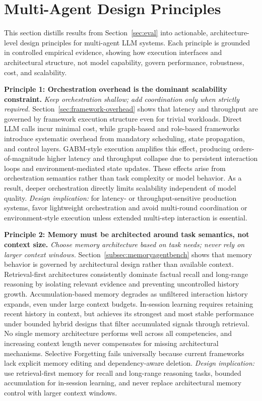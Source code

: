\section{Multi-Agent Design Principles}
\label{sec:design_principles}

This section distills results from Section~\ref{sec:eval} into actionable, architecture-level design principles for multi-agent LLM systems. Each principle is grounded in controlled empirical evidence, showing how execution interfaces and architectural structure, not model capability, govern performance, robustness, cost, and scalability.


\smallskip
\noindent\textbf{Principle 1: Orchestration overhead is the dominant scalability constraint.}
\emph{Keep orchestration shallow; add coordination only when strictly required.} Section~\ref{sec:framework-overhead} shows that latency and throughput are governed by framework execution structure even for trivial workloads. Direct LLM calls incur minimal cost, while graph-based and role-based frameworks introduce systematic overhead from mandatory scheduling, state propagation, and control layers. GABM-style execution amplifies this effect, producing orders-of-magnitude higher latency and throughput collapse due to persistent interaction loops and environment-mediated state updates. These effects arise from orchestration semantics rather than task complexity or model behavior. As a result, deeper orchestration directly limits scalability independent of model quality.
\emph{Design implication:} for latency- or throughput-sensitive production systems, favor lightweight orchestration and avoid multi-round coordination or environment-style execution unless extended multi-step interaction is essential.

\smallskip
\noindent\textbf{Principle 2: Memory must be architected around task semantics, not context size.}
\emph{Choose memory architecture based on task needs; never rely on larger context windows.}
Section~\ref{subsec:memoryagentbench} shows that memory behavior is governed by architectural design rather than available context. Retrieval-first architectures consistently dominate factual recall and long-range reasoning by isolating relevant evidence and preventing uncontrolled history growth. Accumulation-based memory degrades as unfiltered interaction history expands, even under large context budgets. In-session learning requires retaining recent history in context, but achieves its strongest and most stable performance under bounded hybrid designs that filter accumulated signals through retrieval. No single memory architecture performs well across all competencies, and increasing context length never compensates for missing architectural mechanisms. Selective Forgetting fails universally because current frameworks lack explicit memory editing and dependency-aware deletion.
\emph{Design implication:} use retrieval-first memory for recall and long-range reasoning tasks, bounded accumulation for in-session learning, and never replace architectural memory control with larger context windows.

